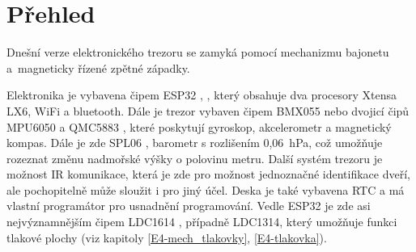 \section{Přehled}

Dnešní verze elektronického trezoru se zamyká pomocí mechanizmu bajonetu a~magneticky řízené zpětné západky. 

Elektronika je vybavena čipem ESP32 \parencite{ESP32}, \parencite{ESP32-WROVER-B},
který obsahuje dva procesory Xtensa LX6, WiFi a bluetooth. Dále je trezor vybaven čipem BMX055 \parencite{bmx055} nebo dvojicí čipů MPU6050 \parencite{mpu6050} 
a QMC5883 \parencite{qmc5883}, které poskytují 
gyroskop, akcelerometr a magnetický kompas. Dále je zde SPL06 \parencite{spl06}, barometr s rozlišením 0,06~hPa, což umožňuje rozeznat změnu nadmořské výšky 
o polovinu metru. Další systém trezoru je možnost IR komunikace, která je zde pro možnost jednoznačné identifikace dveří, ale pochopitelně může 
sloužit i pro jiný účel. Deska je také vybavena RTC a má vlastní programátor pro usnadnění programování. Vedle ESP32 je zde asi 
nejvýznamnějším čipem LDC1614 \parencite{LDC1614}, případně LDC1314, který umožňuje funkci tlakové plochy (viz kapitoly \ref{E4-mech_tlakovky}, \ref{E4-tlakovka}).


\begin{table}[h]
    \centering
    \caption{Shrnutí elektronického vybavení}
    \label{tab:shrnuti}
\end{table}

\newpage